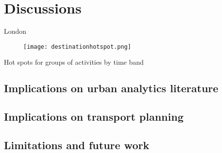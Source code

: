 \pagebreak
\section{Discussions}


London 

\begin{figure}[!ht]
    \centering
    \texttt{[image: destinationhotspot.png]}
    \captionsetup{justification=centering}
    \caption{}
    \label{fig:destinationhotspot}
\end{figure}

Hot spots for groups of activities by time band






\subsection{Implications on urban analytics literature}

\subsection{Implications on transport planning}

\subsection{Limitations and future work}
